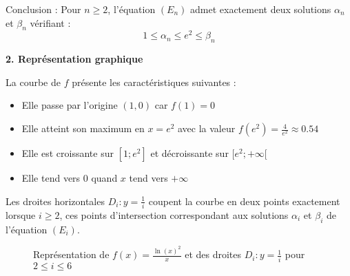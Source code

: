 \documentclass[10pt,a4paper]{article}
\begin{document}
\medskip
Conclusion : Pour \( n \geq 2 \), l'équation \( (E_n) \) admet exactement deux solutions \( \alpha_n
\) et \( \beta_n \) vérifiant :
\[
1 \leq \alpha_n \leq e^2 \leq \beta_n
\]

\bigskip
\textbf{2. Représentation graphique}

La courbe de \( f \) présente les caractéristiques suivantes :
\begin{itemize}
\item Elle passe par l'origine \( (1, 0) \) car \( f(1) = 0 \)
\item Elle atteint son maximum en \( x = e^2 \) avec la valeur \( f(e^2) = \frac{4}{e^2} \approx
0.54 \)
\item Elle est croissante sur \( [1; e^2] \) et décroissante sur \( [e^2; +\infty[ \)
\item Elle tend vers \( 0 \) quand \( x \) tend vers \( +\infty \)
\end{itemize}

\medskip
Les droites horizontales \( D_i : y = \frac{1}{i} \) coupent la courbe en deux points exactement
lorsque \( i \geq 2 \), ces points d'intersection correspondant aux solutions \( \alpha_i \) et \(
\beta_i \) de l'équation \( (E_i) \).


\begin{figure}[htbp]
\centering
{}
\caption{Représentation de $f(x) = \frac{\ln(x)^2}{x}$ et des droites $D_i: y = \frac{1}{i}$ pour $2 \leq i \leq 6$}
\end{figure}
\end{document}
